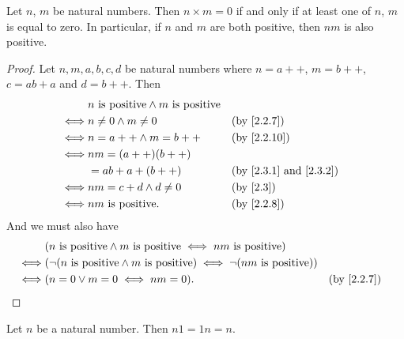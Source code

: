 \begin{lem}\label{2.3.3}
  Let \(n\), \(m\) be natural numbers.
  Then \(n \times m = 0\) if and only if at least one of \(n\), \(m\) is equal to zero.
  In particular, if \(n\) and \(m\) are both positive, then \(nm\) is also positive.
\end{lem}

\begin{proof}
  Let \(n, m, a, b, c, d\) be natural numbers where \(n = a++\), \(m = b++\), \(c = ab + a\) and \(d = b++\).
  Then
  \begin{align*}
         & n \text{ is positive} \land m \text{ is positive}                                                \\
    \iff & n \neq 0 \land m \neq 0                           &  & \text{(by \cref{2.2.7})}                  \\
    \iff & n = a++ \land m = b++                             &  & \text{(by \cref{2.2.10})}                 \\
    \iff & nm = (a++)(b++)                                                                                  \\
         & = ab + a + (b++)                                  &  & \text{(by \cref{2.3.1} and \cref{2.3.2})} \\
    \iff & nm = c + d \land d \neq 0                         &  & \text{(by \cref{2.3})}                    \\
    \iff & nm \text{ is positive}.                           &  & \text{(by \cref{2.2.8})}
  \end{align*}
  And we must also have
  \begin{align*}
         & (n \text{ is positive} \land m \text{ is positive} \iff nm \text{ is positive})                                               \\
    \iff & (\lnot (n \text{ is positive} \land m \text{ is positive}) \iff \lnot (nm \text{ is positive}))                               \\
    \iff & (n = 0 \lor m = 0 \iff nm = 0).                                                                 &  & \text{(by \cref{2.2.7})}
  \end{align*}
\end{proof}

\begin{ac}\label{ac:2.3.4}
  Let \(n\) be a natural number.
  Then \(n1 = 1n = n\).
\end{ac}

